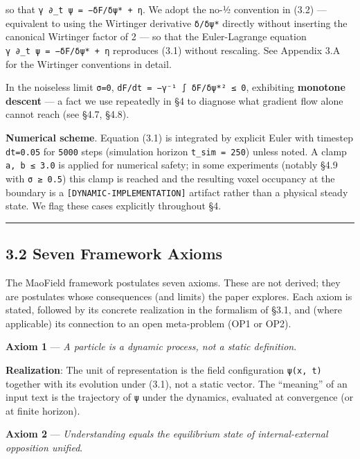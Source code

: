 \documentclass[
]{article}
\begin{document}
so that \texttt{γ\ ∂\_t\ ψ\ =\ −δF/δψ*\ +\ η}. We adopt the no-½
convention in (3.2) --- equivalent to using the Wirtinger derivative
\texttt{δ/δψ*} directly without inserting the canonical Wirtinger factor
of 2 --- so that the Euler-Lagrange equation
\texttt{γ\ ∂\_t\ ψ\ =\ −δF/δψ*\ +\ η} reproduces (3.1) without
rescaling. See Appendix 3.A for the Wirtinger conventions in detail.

In the noiseless limit \texttt{σ=0},
\texttt{dF/dt\ =\ −γ⁻¹\ ∫\ \textbar{}δF/δψ*\textbar{}²\ ≤\ 0},
exhibiting \textbf{monotone descent} --- a fact we use repeatedly in §4
to diagnose what gradient flow alone cannot reach (see §4.7, §4.8).

\textbf{Numerical scheme}. Equation (3.1) is integrated by explicit
Euler with timestep \texttt{dt=0.05} for \texttt{5000} steps (simulation
horizon \texttt{t\_sim\ =\ 250}) unless noted. A clamp
\texttt{\textbar{}a\textbar{},\ \textbar{}b\textbar{}\ ≤\ 3.0} is
applied for numerical safety; in some experiments (notably §4.9 with
\texttt{σ\ ≥\ 0.5}) this clamp is reached and the resulting voxel
occupancy at the boundary is a \texttt{{[}DYNAMIC-IMPLEMENTATION{]}}
artifact rather than a physical steady state. We flag these cases
explicitly throughout §4.

\begin{center}\rule{0.5\linewidth}{0.5pt}\end{center}

\hypertarget{seven-framework-axioms}{%
\subsection{3.2 Seven Framework Axioms}\label{seven-framework-axioms}}

The MaoField framework postulates seven axioms. These are not derived;
they are postulates whose consequences (and limits) the paper explores.
Each axiom is stated, followed by its concrete realization in the
formalism of §3.1, and (where applicable) its connection to an open
meta-problem (OP1 or OP2).

\textbf{Axiom 1} --- \emph{A particle is a dynamic process, not a static
definition}.

\textbf{Realization}: The unit of representation is the field
configuration \texttt{ψ(x,\ t)} together with its evolution under (3.1),
not a static vector. The ``meaning'' of an input text is the trajectory
of \texttt{ψ} under the dynamics, evaluated at convergence (or at finite
horizon).

\textbf{Axiom 2} --- \emph{Understanding equals the equilibrium state of
internal-external opposition unified}.
\end{document}
